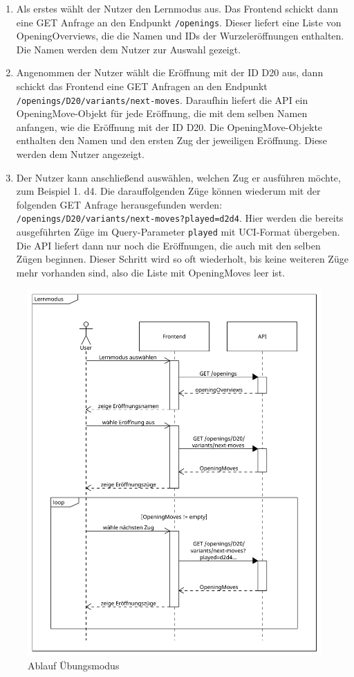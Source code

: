 \begin{enumerate}
     \item Als erstes wählt der Nutzer den Lernmodus aus. Das Frontend schickt dann eine GET Anfrage an den Endpunkt \lstinline{/openings}. Dieser liefert eine Liste von OpeningOverviews, die die Namen und IDs der Wurzeleröffnungen enthalten. Die Namen werden dem Nutzer zur Auswahl gezeigt.
     \item Angenommen der Nutzer wählt die Eröffnung mit der ID D20 aus, dann schickt das Frontend eine GET Anfragen an den Endpunkt \lstinline|/openings/D20/variants/next-moves|. Daraufhin liefert die API ein OpeningMove-Objekt für jede Eröffnung, die mit dem selben Namen anfangen, wie die Eröffnung mit der ID D20. Die OpeningMove-Objekte enthalten den Namen und den ersten Zug der jeweiligen Eröffnung. Diese werden dem Nutzer angezeigt.
     \item Der Nutzer kann anschließend auswählen, welchen Zug er ausführen möchte, zum Beispiel 1. d4. Die darauffolgenden Züge können wiederum mit der folgenden GET Anfrage herausgefunden werden: \lstinline|/openings/D20/variants/next-moves?played=d2d4|. Hier werden die bereits ausgeführten Züge im Query-Parameter \lstinline{played} mit \ac{UCI}-Format übergeben. Die API liefert dann nur noch die Eröffnungen, die auch mit den selben Zügen beginnen. Dieser Schritt wird so oft wiederholt, bis keine weiteren Züge mehr vorhanden sind, also die Liste mit OpeningMoves leer ist.
\end{enumerate}

\begin{figure}
    \includegraphics[width=\linewidth]{images/diagrams/sd_opening_training}
    \caption{Ablauf Übungsmodus}
    \label{fig:sd_opening_training}
\end{figure}

